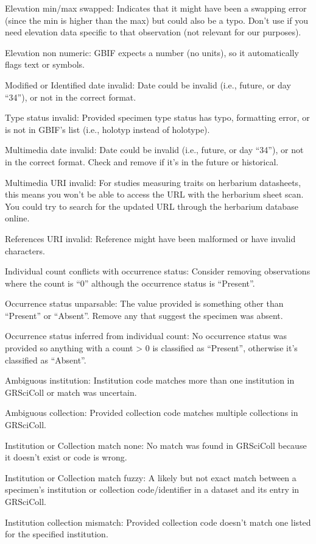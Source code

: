 \documentclass[
]{article}
\begin{document}
Elevation min/max swapped: Indicates that it might have been a swapping
error (since the min is higher than the max) but could also be a typo.
Don't use if you need elevation data specific to that observation (not
relevant for our purposes).

Elevation non numeric: GBIF expects a number (no units), so it
automatically flags text or symbols.

Modified or Identified date invalid: Date could be invalid (i.e.,
future, or day ``34''), or not in the correct format.

Type status invalid: Provided specimen type status has typo, formatting
error, or is not in GBIF's list (i.e., holotyp instead of holotype).

Multimedia date invalid: Date could be invalid (i.e., future, or day
``34''), or not in the correct format. Check and remove if it's in the
future or historical.

Multimedia URI invalid: For studies measuring traits on herbarium
datasheets, this means you won't be able to access the URL with the
herbarium sheet scan. You could try to search for the updated URL
through the herbarium database online.

References URI invalid: Reference might have been malformed or have
invalid characters.

Individual count conflicts with occurrence status: Consider removing
observations where the count is ``0'' although the occurrence status is
``Present''.

Occurrence status unparsable: The value provided is something other than
``Present'' or ``Absent''. Remove any that suggest the specimen was
absent.

Occurrence status inferred from individual count: No occurrence status
was provided so anything with a count \textgreater{} 0 is classified as
``Present'', otherwise it's classified as ``Absent''.

Ambiguous institution: Institution code matches more than one
institution in GRSciColl or match was uncertain.

Ambiguous collection: Provided collection code matches multiple
collections in GRSciColl.

Institution or Collection match none: No match was found in GRSciColl
because it doesn't exist or code is wrong.

Institution or Collection match fuzzy: A likely but not exact match
between a specimen's institution or collection code/identifier in a
dataset and its entry in GRSciColl.

Institution collection mismatch: Provided collection code doesn't match
one listed for the specified institution.
\end{document}

